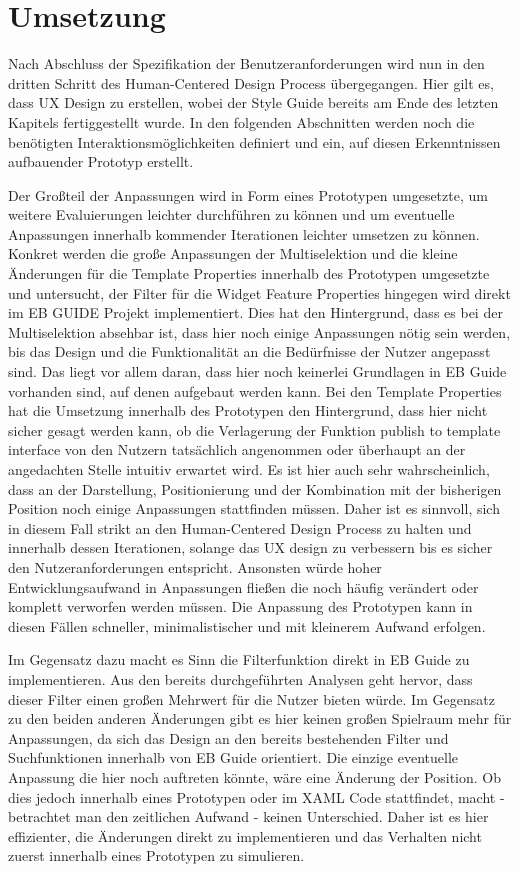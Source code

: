 \chapter{Umsetzung}\label{ch:experiments}

Nach Abschluss der Spezifikation der Benutzeranforderungen wird nun in den dritten Schritt des Human-Centered Design Process übergegangen.
Hier gilt es, dass UX Design zu erstellen, wobei der Style Guide bereits am Ende des letzten Kapitels fertiggestellt wurde.
In den folgenden Abschnitten werden noch die benötigten Interaktionsmöglichkeiten definiert und ein, auf diesen Erkenntnissen aufbauender Prototyp erstellt.

Der Großteil der Anpassungen wird in Form eines Prototypen umgesetzte, um weitere Evaluierungen leichter durchführen zu können und um eventuelle Anpassungen innerhalb kommender Iterationen leichter umsetzen zu können.
Konkret werden die große Anpassungen der Multiselektion und die kleine Änderungen für die Template Properties innerhalb des Prototypen umgesetzte und untersucht, der Filter für die Widget Feature Properties hingegen wird direkt im EB GUIDE Projekt implementiert.
Dies hat den Hintergrund, dass es bei der Multiselektion absehbar ist, dass hier noch einige Anpassungen nötig sein werden, bis das Design und die Funktionalität an die Bedürfnisse der Nutzer angepasst sind.
Das liegt vor allem daran, dass hier noch keinerlei Grundlagen in EB Guide vorhanden sind, auf denen aufgebaut werden kann.
Bei den Template Properties hat die Umsetzung innerhalb des Prototypen den Hintergrund, dass hier nicht sicher gesagt werden kann, ob die Verlagerung der Funktion \glqq publish to template interface\grqq{} von den Nutzern tatsächlich angenommen oder überhaupt an der angedachten Stelle intuitiv erwartet wird.
Es ist hier auch sehr wahrscheinlich, dass an der Darstellung, Positionierung und der Kombination mit der bisherigen Position noch einige Anpassungen stattfinden müssen.
Daher ist es sinnvoll, sich in diesem Fall strikt an den Human-Centered Design Process zu halten und innerhalb dessen Iterationen, solange das UX design zu verbessern bis es sicher den Nutzeranforderungen entspricht.
Ansonsten würde hoher Entwicklungsaufwand in Anpassungen fließen die noch häufig verändert oder komplett verworfen werden müssen.
Die Anpassung des Prototypen kann in diesen Fällen schneller, minimalistischer und mit kleinerem Aufwand erfolgen.

Im Gegensatz dazu macht es Sinn die Filterfunktion direkt in EB Guide zu implementieren.
Aus den bereits durchgeführten Analysen geht hervor, dass dieser Filter einen großen Mehrwert für die Nutzer bieten würde.
Im Gegensatz zu den beiden anderen Änderungen gibt es hier keinen großen Spielraum mehr für Anpassungen, da sich das Design an den bereits bestehenden Filter und Suchfunktionen innerhalb von EB Guide orientiert.
Die einzige eventuelle Anpassung die hier noch auftreten könnte, wäre eine Änderung der Position.
Ob dies jedoch innerhalb eines Prototypen oder im XAML Code stattfindet, macht - betrachtet man den zeitlichen Aufwand - keinen Unterschied.
Daher ist es hier effizienter, die Änderungen direkt zu implementieren und das Verhalten nicht zuerst innerhalb eines Prototypen zu simulieren.

